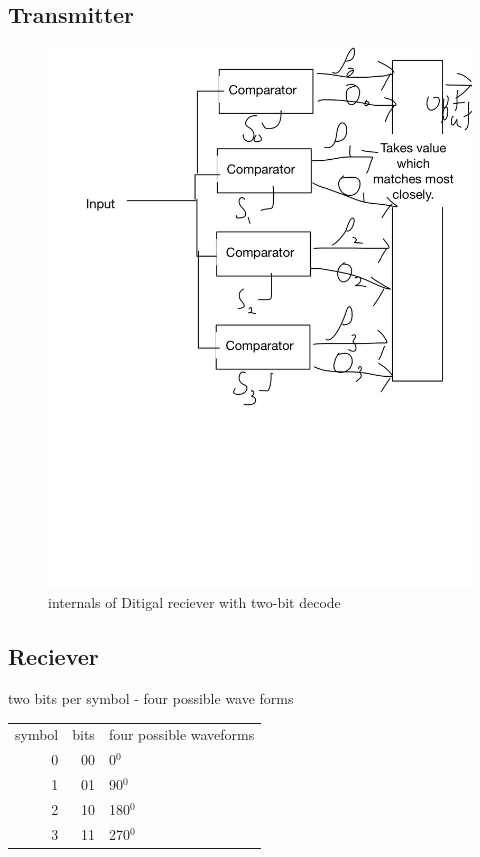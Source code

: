 \documentclass[11pt]{article}
\begin{document}
\subsection{Transmitter}
\label{sec-5-1}
\begin{figure}[htb]
\centering
\includegraphics[width=.9\linewidth]{./img/Digital_reciever.png}
\caption{internals of Ditigal reciever with two-bit decode}
\end{figure}

\subsection{Reciever}
\label{sec-5-2}


two bits per symbol - four possible wave forms
\begin{center}
\begin{tabular}{rrl}
symbol & bits & four possible waveforms\\
0 & 00 & 0$^{\text{0}}$\\
1 & 01 & 90$^{\text{0}}$\\
2 & 10 & 180$^{\text{0}}$\\
3 & 11 & 270$^{\text{0}}$\\
\end{tabular}
\end{center}
\end{document}
